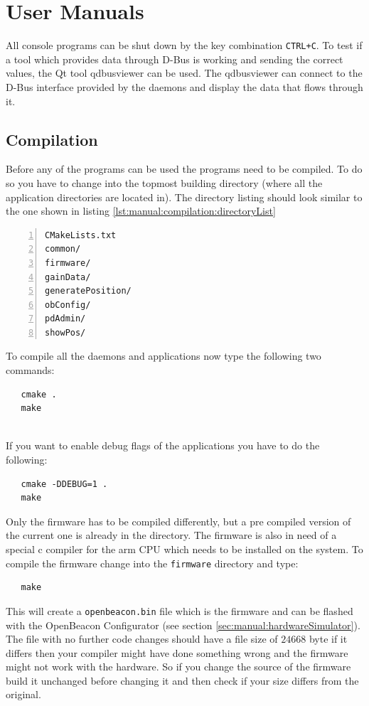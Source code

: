 \chapter{User Manuals}
 All console programs can be shut down by the key combination \texttt{CTRL+C}. To test if a tool which provides data through D-Bus is working and sending the correct values, the Qt tool qdbusviewer can be used. The qdbusviewer can connect to the D-Bus interface provided by the daemons and display the data that flows through it.

 \section{Compilation}
  Before any of the programs can be used the programs need to be compiled. To do so you have to change into the topmost building directory (where all the application directories are located in). The directory listing should look similar to the one shown in listing \ref{lst:manual:compilation:directoryList}
  \begin{lstlisting}[frame=single,breaklines,basicstyle=\footnotesize,numbers=left,label=lst:manual:compilation:directoryList,captionpos=b,caption={Project directory list}]
CMakeLists.txt
common/
firmware/
gainData/
generatePosition/
obConfig/
pdAdmin/
showPos/
  \end{lstlisting}
  To compile all the daemons and applications now type the following two commands:
  \begin{verbatim}
   cmake .
   make
  \end{verbatim}
  \\
  If you want to enable debug flags of the applications you have to do the following:
  \begin{verbatim}
   cmake -DDEBUG=1 .
   make
  \end{verbatim}

  Only the firmware has to be compiled differently, but a pre compiled version of the current one is already in the directory. The firmware is also in need of a special c compiler for the arm CPU which needs to be installed on the system. To compile the firmware change into the \verb=firmware= directory and type:
  \begin{verbatim}
   make
  \end{verbatim}
  This will create a \verb=openbeacon.bin= file which is the firmware and can be flashed with the OpenBeacon Configurator (see section \ref{sec:manual:hardwareSimulator}). The file with no further code changes should have a file size of $24668$ byte if it differs then your compiler might have done something wrong and the firmware might not work with the hardware. So if you change the source of the firmware build it unchanged before changing it and then check if your size differs from the original.

